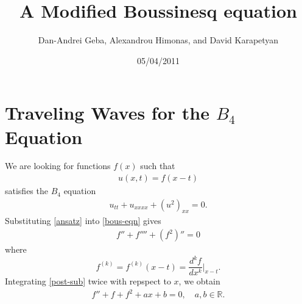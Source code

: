 \documentclass[12pt,reqno]{amsart}
\numberwithin{equation}{section}  %
\newcommand{\rr}{\mathbb{R}}
\begin{document}
\title{A Modified Boussinesq equation}
\author{Dan-Andrei Geba, Alexandrou Himonas, and David Karapetyan}
\address{Department of Mathematics, University of Rochester, Rochester, NY 14627}
\address{Department of Mathematics, University of Notre Dame, Notre Dame, IN 46556}
\address{Department of Mathematics, University of Notre Dame, Notre Dame, IN 46556}
\date{05/04/2011}
%
%
\maketitle
%
%
%
%
%
%
%
%
\section{Traveling Waves for the $B_{4}$ Equation} 
\label{sec:trav-wave}
We are looking for functions $f(x)$ such that
%
%
\begin{equation}
  \label{ansatz}
\begin{split}
u(x,t) = f(x-t)
\end{split}
\end{equation}
%
%
satisfies the $B_{4}$ equation
%
%
\begin{equation}
  \label{bous-eqn}
\begin{split}
  u_{tt} + u_{xxxx} + (u^{2})_{xx} = 0.
\end{split}
\end{equation}
%
%
Substituting \eqref{ansatz} into \eqref{bous-eqn} gives
%
%
\begin{equation}
\begin{split}
 f'' + f'''' + (f^{2})'' = 0
\end{split}
\label{post-sub}
\end{equation}
%
%
where $$f^{(k)} = f^{(k)}(x-t) = \frac{d^{k}f}{dx^{k}} \Big |_{x-t}.$$ 
Integrating \eqref{post-sub} twice with repspect to $x$, we obtain
%
%
\begin{equation}
  \label{pre-const-elim}
\begin{split}
  f'' + f + f^{2} + ax +b = 0, \quad a,b \in \rr.
\end{split}
\end{equation}
%
%
\end{document}
